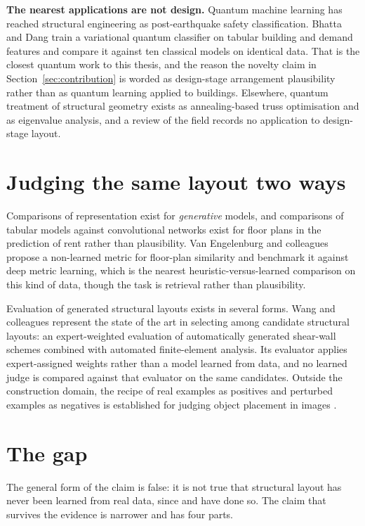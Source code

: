 \textbf{The nearest applications are not design.} Quantum machine learning
has reached structural engineering as post-earthquake safety
classification. Bhatta and Dang \citep{bhatta2024quantum} train a
variational quantum classifier on tabular building and demand features and
compare it against ten classical models on identical data. That is the
closest quantum work to this thesis, and the reason the novelty claim in
Section~\ref{sec:contribution} is worded as design-stage arrangement
plausibility rather than as quantum learning applied to buildings.
Elsewhere, quantum treatment of structural geometry exists as
annealing-based truss optimisation and as eigenvalue analysis, and a
review of the field \citep{ploennigs2026quantumcivil} records no
application to design-stage layout.

\section{Judging the same layout two ways}

Comparisons of representation exist for \emph{generative} models, and
comparisons of tabular models against convolutional networks exist for
floor plans in the prediction of rent rather than plausibility. Van
Engelenburg and colleagues \citep{vanengelenburg2023ssig} propose a
non-learned metric for floor-plan similarity and benchmark it against deep
metric learning, which is the nearest heuristic-versus-learned comparison
on this kind of data, though the task is retrieval rather than
plausibility.

Evaluation of generated structural layouts exists in several forms. Wang
and colleagues \citep{wang2025experteval} represent the state of the art
in selecting among candidate structural layouts: an expert-weighted
evaluation of automatically generated shear-wall schemes combined with
automated finite-element analysis. Its evaluator applies expert-assigned
weights rather than a model learned from data, and no learned judge is
compared against that evaluator on the same candidates. Outside the
construction domain, the recipe of real examples as positives and
perturbed examples as negatives is established for judging object
placement in images \citep{liu2024diffpop}.

\section{The gap}
\label{sec:gap}
\label{sec:labelgap}

The general form of the claim is false: it is not true that structural
layout has never been learned from real data, since
\citet{liao2021shearwallgan} and \citet{pizarro2021walls} have done so.
The claim that survives the evidence is narrower and has four parts.

